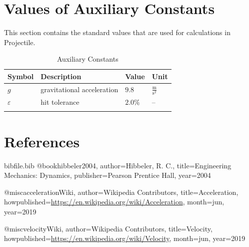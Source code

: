 \documentclass[12pt]{article}
\begin{document}
\section{Values of Auxiliary Constants}
\label{Sec:AuxConstants}
This section contains the standard values that are used for calculations in Projectile.
\begin{longtable}{l l l l}
\toprule
Symbol & Description & Value & Unit
\\
\midrule
\endhead
$g$ & gravitational acceleration & $9.8$ & $\frac{\text{m}}{\text{s}^{2}}$
\\
$ε$ & hit tolerance & $2.0\%$ & --
\\
\bottomrule
\caption{Auxiliary Constants}
\label{Table:TAuxConsts}
\end{longtable}
\section{References}
\label{Sec:References}
\begin{filecontents*}{bibfile.bib}
@book{hibbeler2004,
author={Hibbeler, R. C.},
title={Engineering Mechanics: Dynamics},
publisher={Pearson Prentice Hall},
year={2004}}

@misc{accelerationWiki,
author={Wikipedia Contributors},
title={Acceleration},
howpublished={\url{https://en.wikipedia.org/wiki/Acceleration}},
month=jun,
year={2019}}

@misc{velocityWiki,
author={Wikipedia Contributors},
title={Velocity},
howpublished={\url{https://en.wikipedia.org/wiki/Velocity}},
month=jun,
year={2019}}
\end{filecontents*}
\nocite{*}
\printbibliography[heading=none]
\end{document}
